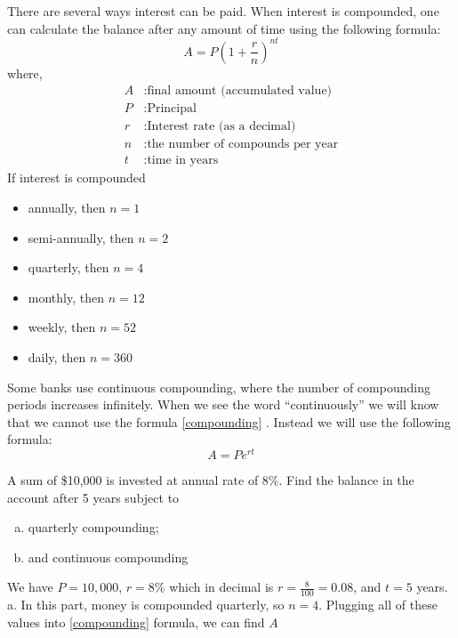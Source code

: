 There are several ways interest can be paid. When interest is compounded, one
can calculate the balance after any amount of time using the following formula:
		\begin{equation}
			A=P\left(1+\frac{r}{n} \right)^{nt}
			\label{compounding}
		\end{equation}
where,
		\begin{align*}
			A &: \text{final amount (accumulated value)} \\
			P &: \text{Principal} \\
			r &: \text{Interest rate (as a decimal)}\\
			n &: \text{the number of compounds per year}\\
			t &: \text{time in years}
		\end{align*}
If interest is compounded 
		\begin{multicols}{2}
		\begin{itemize}
			\item annually, then $n=1$
			\item semi-annually, then $n=2$
			\item quarterly, then $n=4$
			\item monthly, then $n=12$
			\item weekly, then $n=52$
			\item daily, then $n=360$
		\end{itemize}
		\end{multicols}
Some banks use continuous compounding, where the number of compounding periods increases
infinitely. When we see the word “continuously” we will know that we cannot use the
formula \eqref{compounding} . Instead we will use the following formula:
		\begin{equation}
			A=Pe^{rt}
			\label{compounding_cont}
		\end{equation}
\begin{exa}
A sum of \$10,000 is invested at annual rate of 8\%. Find the balance in the account after 5
years subject to 
		\begin{enumerate}[a.]
 			\item quarterly compounding;
			 \item and continuous compounding	
		 \end{enumerate}
\end{exa}
We have $P=10,000$, $r=8\%$ which in decimal is $r=\frac{8}{100}=0.08$, and $t=5$ years.
a. In this part, money is compounded quarterly, so $n=4$. Plugging all of these values into
\eqref{compounding} formula, we can find $A$
